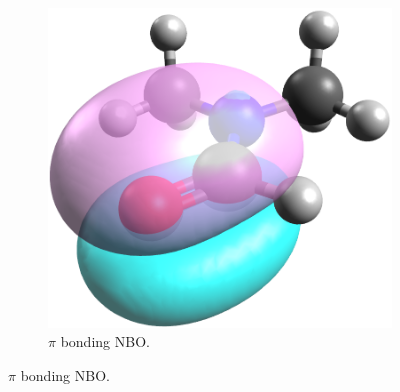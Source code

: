 \begin{refsection}
\begin{figure}
\begin{subfigure}{0.3\linewidth}
        \includegraphics[width=\linewidth]{Figures/dmfnbo-pi.png}
        \caption{$ \pi $ bonding NBO.}
    \end{subfigure}


\end{figure}
\end{refsection}
